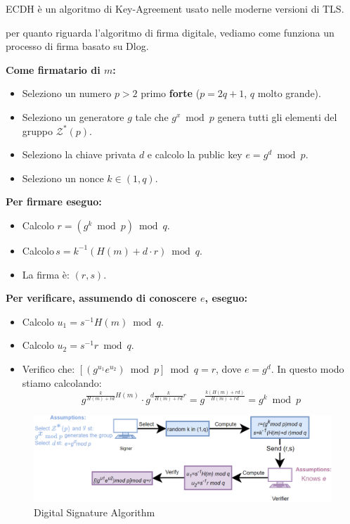 \begin{note}
ECDH è un algoritmo di Key-Agreement usato nelle moderne versioni di TLS.
\end{note}
per quanto riguarda l'algoritmo di firma digitale, vediamo come funziona un processo di firma basato su Dlog.
\pagebreak
\begin{definition}
\textbf{Come firmatario di $m$:}
\begin{itemize}
    \item Seleziono un numero $p>2$ primo \textbf{forte} ($p=2q+1$, $q$ molto grande).
    \item Seleziono un generatore $g$ tale che $g^x\bmod p$ genera tutti gli elementi del gruppo $\mathcal{Z}^*(p)$.
    \item Seleziono la chiave privata $d$ e calcolo la public key $e=g^d\bmod p$.
    \item Seleziono un nonce $k\in(1,q)$.
\end{itemize}
\textbf{Per firmare eseguo:}
\begin{itemize}
    \item Calcolo $r=(g^k\bmod p)\bmod q$.
    \item Calcolo\footnotemark \,$s=k^{-1}(H(m)+d\cdot r)\bmod q$.
    \item La firma è: $(r,s)$.
\end{itemize}
\textbf{Per verificare, assumendo di conoscere $e$, eseguo:}
\begin{itemize}
    \item Calcolo $u_1=s^{-1}H(m)\bmod q$.
    \item Calcolo $u_2=s^{-1}r\bmod q$.
    \item Verifico che: $[(g^{u_1}e^{u_2})\bmod p]\bmod q=r$, dove $e=g^d$. In questo modo stiamo calcolando:
    \[
    g^{\frac{k}{H(m)+rd}H(m)}\cdot g^{d\frac{k}{H(m)+rd}r}=g^{\frac{k(H(m)+rd)}{H(m)+rd}}=g^k\bmod{p}
    \]
\end{itemize}
\end{definition}
\begin{figure}[h]
    \centering
    \includegraphics{image/ecc/dsa.png}
    \caption{Digital Signature Algorithm}
    \label{fig:dsa}
\end{figure}
